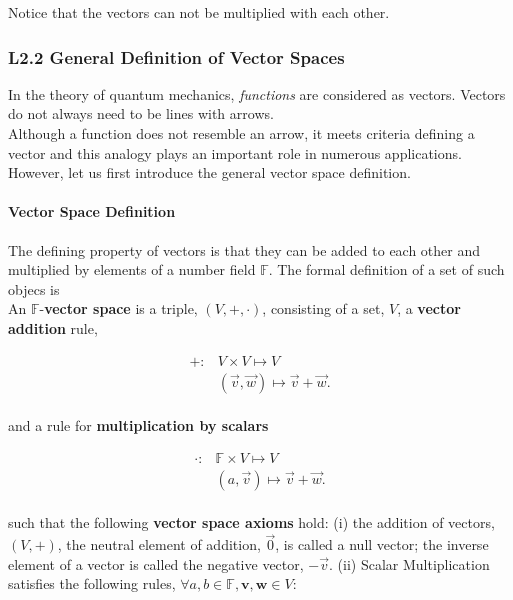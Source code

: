 \documentclass[11pt, oneside]{article}   	%
\begin{document}
  Notice that the vectors can not be multiplied with each other. 

\subsubsection{L2.2 General Definition of Vector Spaces}

In the theory of quantum mechanics, \textit{functions} are considered as
vectors. Vectors do not always need to be lines with arrows. \\

Although a function does not resemble an arrow, it meets criteria defining
a vector and this analogy plays an important role in numerous applications. \\

However, let us first introduce the general vector space definition. 

\paragraph{Vector Space Definition} 

The defining property of vectors is that they can be added to each other and
multiplied by elements of a number field $\mathbb{F}$. The formal definition of
a set of such objecs is \\
An $\mathbb{F}$-\textbf{vector space} is a triple, $(V, +, \cdot)$, consisting
of a set, $V$, a \textbf{vector addition} rule, 

\begin{align*}
  + : &V \times V \mapsto V \\
      &(\vec{v}, \vec{w} ) \mapsto \vec{v} + \vec{w}. 
\end{align*}\\ 

and a rule for \textbf{multiplication by scalars}

\begin{align*}
  \cdot :& \mathbb{F} \times V \mapsto V \\
  &(a, \vec{v}) \mapsto \vec{v} + \vec{w}. 
\end{align*}\\ 

such that the following \textbf{vector space axioms} hold: (i) the addition of
vectors, $(V,+)$, the neutral element of addition, $\vec{0}$, is called a null
vector; the inverse element of a vector is called the negative vector,
$-\vec{v}$. (ii) Scalar Multiplication satisfies the following rules, $\forall
a, b \in \mathbb{F}, \textbf{v}, \textbf{w} \in V$:
\end{document}
